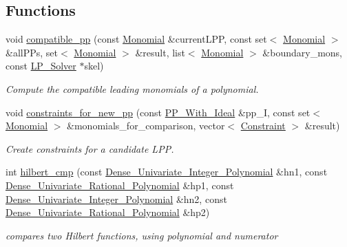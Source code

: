 \subsection*{Functions}
\begin{DoxyCompactItemize}
\item 
void \hyperlink{group___g_b_computation_ga798232a9bc6d93f8a0ad69d5af6b349f}{compatible\+\_\+pp} (const \hyperlink{group__polygroup_class_monomial}{Monomial} \&current\+L\+PP, const set$<$ \hyperlink{group__polygroup_class_monomial}{Monomial} $>$ \&all\+P\+Ps, set$<$ \hyperlink{group__polygroup_class_monomial}{Monomial} $>$ \&result, list$<$ \hyperlink{group__polygroup_class_monomial}{Monomial} $>$ \&boundary\+\_\+mons, const \hyperlink{group___c_l_s_solvers_class_l_p___solvers_1_1_l_p___solver}{L\+P\+\_\+\+Solver} $\ast$skel)
\begin{DoxyCompactList}\small\item\em Compute the compatible leading monomials of a polynomial. \end{DoxyCompactList}\item 
void \hyperlink{group___g_b_computation_ga6184088d03d37694f86acf5ac99cf75e}{constraints\+\_\+for\+\_\+new\+\_\+pp} (const \hyperlink{group___g_b_computation_class_dynamic___engine_1_1_p_p___with___ideal}{P\+P\+\_\+\+With\+\_\+\+Ideal} \&pp\+\_\+I, const set$<$ \hyperlink{group__polygroup_class_monomial}{Monomial} $>$ \&monomials\+\_\+for\+\_\+comparison, vector$<$ \hyperlink{group___c_l_s_solvers_class_l_p___solvers_1_1_constraint}{Constraint} $>$ \&result)
\begin{DoxyCompactList}\small\item\em Create constraints for a candidate L\+PP. \end{DoxyCompactList}\item 
int \hyperlink{group___g_b_computation_ga9be1af3b4560bec7a8f17c5716e33ee7}{hilbert\+\_\+cmp} (const \hyperlink{group__polygroup_class_dense___univariate___integer___polynomial}{Dense\+\_\+\+Univariate\+\_\+\+Integer\+\_\+\+Polynomial} \&hn1, const \hyperlink{group__polygroup_class_dense___univariate___rational___polynomial}{Dense\+\_\+\+Univariate\+\_\+\+Rational\+\_\+\+Polynomial} \&hp1, const \hyperlink{group__polygroup_class_dense___univariate___integer___polynomial}{Dense\+\_\+\+Univariate\+\_\+\+Integer\+\_\+\+Polynomial} \&hn2, const \hyperlink{group__polygroup_class_dense___univariate___rational___polynomial}{Dense\+\_\+\+Univariate\+\_\+\+Rational\+\_\+\+Polynomial} \&hp2)
\begin{DoxyCompactList}\small\item\em compares two Hilbert functions, using polynomial and numerator \end{DoxyCompactList}\item 

\end{DoxyCompactItemize}
